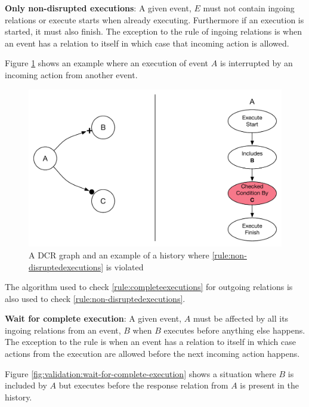 	\begin{ruledef}
		\textbf{Only non-disrupted executions}: A given event, $E$ must not contain ingoing relations or execute starts when already executing. Furthermore if an execution is started, it must also finish. The exception to the rule of ingoing relations is when an event has a relation to itself in which case that incoming action is allowed.
		\label{rule:non-disruptedexecutions}
	\end{ruledef}
	
	\noindent Figure \ref{fig:validation:only-non-disrupted-executions} shows an example where an execution of event $A$ is interrupted by an incoming action from another event.
	
	\begin{figure}[H]
		\centering
		\includegraphics[width=.7\textwidth]{5validation/images/only-nondisrupted-executions.pdf}
		\caption{A DCR graph and an example of a history where \autoref{rule:non-disruptedexecutions} is violated}
		\label{fig:validation:only-non-disrupted-executions}
	\end{figure}
		
	\noindent The algorithm used to check \autoref{rule:completeexecutions} for outgoing relations is also used to check \autoref{rule:non-disruptedexecutions}.
	
	\begin{ruledef}
		\textbf{Wait for complete execution}: A given event, $A$ must be affected by all its ingoing relations from an event, $B$ when $B$ executes before anything else happens. The exception to the rule is when an event has a relation to itself in which case actions from the execution are allowed before the next incoming action happens. 
		\label{rule:wait-for-complete-execution}
	\end{ruledef}
	
	\noindent Figure \ref{fig:validation:wait-for-complete-execution} shows a situation where $B$ is included by $A$ but executes before the response relation from $A$ is present in the history.
	

